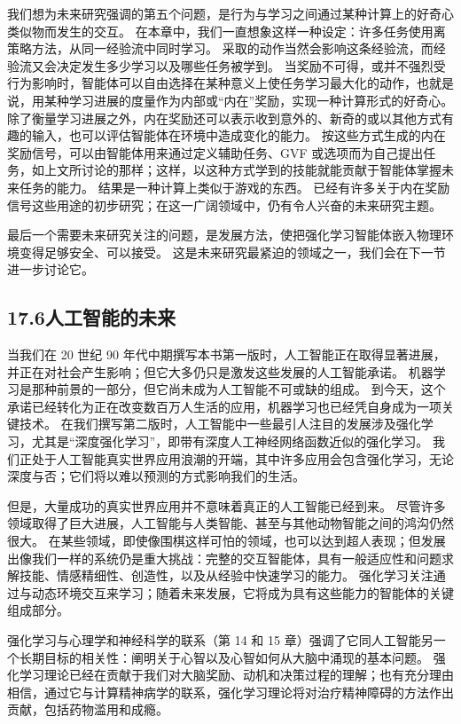\documentclass[UTF8, 12pt, fontset=fandol, oneside]{ctexart}
\begin{document}
我们想为未来研究强调的第五个问题，是行为与学习之间通过某种计算上的好奇心类似物而发生的交互。
在本章中，我们一直想象这样一种设定：许多任务使用离策略方法，从同一经验流中同时学习。
采取的动作当然会影响这条经验流，而经验流又会决定发生多少学习以及哪些任务被学到。
当奖励不可得，或并不强烈受行为影响时，智能体可以自由选择在某种意义上使任务学习最大化的动作，也就是说，用某种学习进展的度量作为内部或“内在”奖励，实现一种计算形式的好奇心。
除了衡量学习进展之外，内在奖励还可以表示收到意外的、新奇的或以其他方式有趣的输入，也可以评估智能体在环境中造成变化的能力。
按这些方式生成的内在奖励信号，可以由智能体用来通过定义辅助任务、GVF 或选项而为自己提出任务，如上文所讨论的那样；这样，以这种方式学到的技能就能贡献于智能体掌握未来任务的能力。
结果是一种计算上类似于游戏的东西。
已经有许多关于内在奖励信号这些用途的初步研究；在这一广阔领域中，仍有令人兴奋的未来研究主题。

最后一个需要未来研究关注的问题，是发展方法，使把强化学习智能体嵌入物理环境变得足够安全、可以接受。
这是未来研究最紧迫的领域之一，我们会在下一节进一步讨论它。

\subsection*{17.6\quad 人工智能的未来}

当我们在 20 世纪 90 年代中期撰写本书第一版时，人工智能正在取得显著进展，并正在对社会产生影响；但它大多仍只是激发这些发展的人工智能承诺。
机器学习是那种前景的一部分，但它尚未成为人工智能不可或缺的组成。
到今天，这个承诺已经转化为正在改变数百万人生活的应用，机器学习也已经凭自身成为一项关键技术。
在我们撰写第二版时，人工智能中一些最引人注目的发展涉及强化学习，尤其是“深度强化学习”，即带有深度人工神经网络函数近似的强化学习。
我们正处于人工智能真实世界应用浪潮的开端，其中许多应用会包含强化学习，无论深度与否；它们将以难以预测的方式影响我们的生活。

但是，大量成功的真实世界应用并不意味着真正的人工智能已经到来。
尽管许多领域取得了巨大进展，人工智能与人类智能、甚至与其他动物智能之间的鸿沟仍然很大。
在某些领域，即使像围棋这样可怕的领域，也可以达到超人表现；但发展出像我们一样的系统仍是重大挑战：完整的交互智能体，具有一般适应性和问题求解技能、情感精细性、创造性，以及从经验中快速学习的能力。
强化学习关注通过与动态环境交互来学习；随着未来发展，它将成为具有这些能力的智能体的关键组成部分。

强化学习与心理学和神经科学的联系（第 14 和 15 章）强调了它同人工智能另一个长期目标的相关性：阐明关于心智以及心智如何从大脑中涌现的基本问题。
强化学习理论已经在贡献于我们对大脑奖励、动机和决策过程的理解；也有充分理由相信，通过它与计算精神病学的联系，强化学习理论将对治疗精神障碍的方法作出贡献，包括药物滥用和成瘾。
\end{document}
